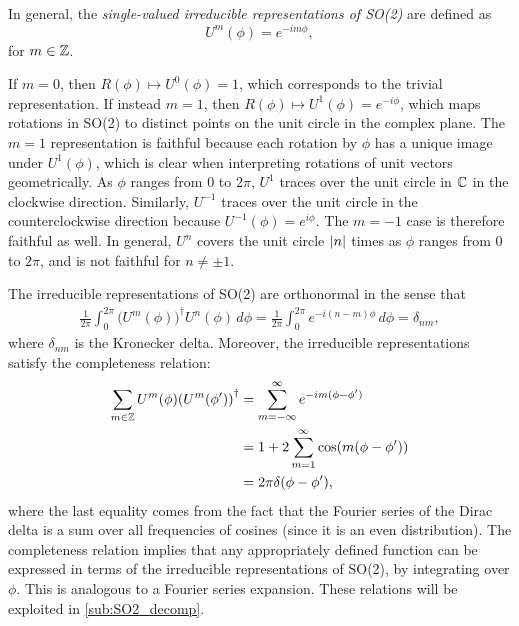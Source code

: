 In general, the \textit{single-valued irreducible representations of SO(2)} are defined as
\begin{equation}
    U^m(\phi) = e^{-im\phi},
\end{equation}
for $m\in\mathbb{Z}$.

If $m=0$, then $R(\phi)\mapsto U^0(\phi) = 1$, which corresponds to the trivial representation. If instead $m=1$, then $R(\phi)\mapsto U^1(\phi) = e^{-i\phi}$, which maps rotations in SO(2) to distinct points on the unit circle in the complex plane. The $m=1$ representation is faithful because each rotation by $\phi$ has a unique image under $U^1(\phi)$, which is clear when interpreting rotations of unit vectors geometrically. As $\phi$ ranges from 0 to $2\pi$, $U^1$ traces over the unit circle in $\mathbb{C}$ in the clockwise direction. Similarly, $U^{-1}$ traces over the unit circle in the counterclockwise direction because $U^{-1}(\phi)=e^{i\phi}$. The $m=-1$ case is therefore faithful as well. In general, $U^n$ covers the unit circle $\left|n\right|$ times as $\phi$ ranges from 0 to $2\pi$, and is not faithful for $n\neq\pm1$.

The irreducible representations of SO(2) are orthonormal in the sense that
\begin{align}
    \frac{1}{2\pi}\int_{0}^{2\pi}{\bigl(U^m(\phi)\bigr)}^\dagger U^n(\phi) \,d\phi = \frac{1}{2\pi}\int_{0}^{2\pi} e^{-i(n-m)\phi} \,d\phi = \delta_{nm},\label{eq:orthogonality}
\end{align}
where $\delta_{nm}$ is the Kronecker delta.
Moreover, the irreducible representations satisfy the completeness relation:
\begin{align}
    \begin{split}    
    \sum_{m\in\mathbb{Z}} U^m(\phi){(U^m(\phi'))}^\dagger 
        &= \sum_{m=-\infty}^\infty e^{-im(\phi-\phi')} \\
        &= 1 + 2\sum_{m=1}^{\infty}\cos(m(\phi-\phi')) \\
        &= 2\pi\delta(\phi-\phi'),
    \end{split}\label{eq:completeness}
\end{align}
where the last equality comes from the fact that the Fourier series of the Dirac delta is a sum over all frequencies of cosines (since it is an even distribution). The completeness relation implies that any appropriately defined function can be expressed in terms of the irreducible representations of SO(2), by integrating over $\phi$. This is analogous to a Fourier series expansion.
These relations will be exploited in \cref{sub:SO2_decomp}.

